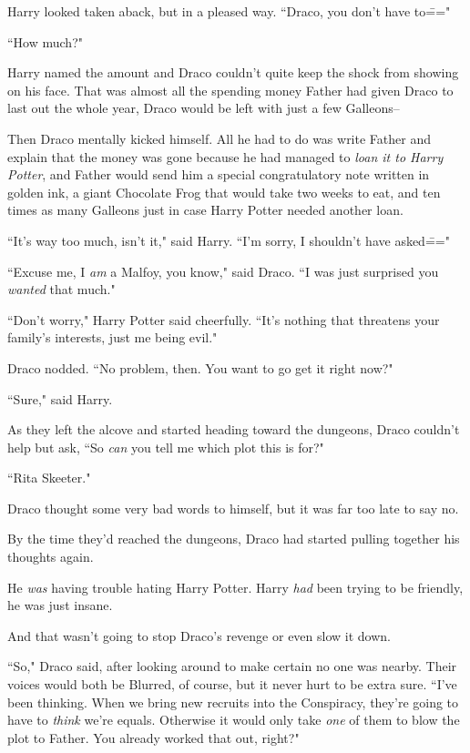 Harry looked taken aback, but in a pleased way. ``Draco, you don't have to\==="

``How much?"

Harry named the amount and Draco couldn't quite keep the shock from showing on his face. That was almost all the spending money Father had given Draco to last out the whole year, Draco would be left with just a few Galleons\---

Then Draco mentally kicked himself. All he had to do was write Father and explain that the money was gone because he had managed to \emph{loan it to Harry Potter}, and Father would send him a special congratulatory note written in golden ink, a giant Chocolate Frog that would take two weeks to eat, and ten times as many Galleons just in case Harry Potter needed another loan.

``It's way too much, isn't it," said Harry. ``I'm sorry, I shouldn't have asked\==="

``Excuse me, I \emph{am} a Malfoy, you know," said Draco. ``I was just surprised you \emph{wanted} that much."

``Don't worry," Harry Potter said cheerfully. ``It's nothing that threatens your family's interests, just me being evil."

Draco nodded. ``No problem, then. You want to go get it right now?"

``Sure," said Harry.

As they left the alcove and started heading toward the dungeons, Draco couldn't help but ask, ``So \emph{can} you tell me which plot this is for?"

``Rita Skeeter."

Draco thought some very bad words to himself, but it was far too late to say no.

\later

By the time they'd reached the dungeons, Draco had started pulling together his thoughts again.

He \emph{was} having trouble hating Harry Potter. Harry \emph{had} been trying to be friendly, he was just insane.

And that wasn't going to stop Draco's revenge or even slow it down.

``So," Draco said, after looking around to make certain no one was nearby. Their voices would both be Blurred, of course, but it never hurt to be extra sure. ``I've been thinking. When we bring new recruits into the Conspiracy, they're going to have to \emph{think} we're equals. Otherwise it would only take \emph{one} of them to blow the plot to Father. You already worked that out, right?"

